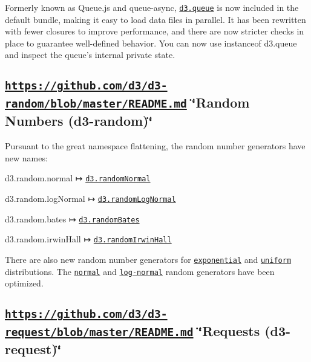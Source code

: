 Formerly known as Queue.\+js and queue-\/async, \href{https://github.com/d3/d3-queue}{\tt d3.\+queue} is now included in the default bundle, making it easy to load data files in parallel. It has been rewritten with fewer closures to improve performance, and there are now stricter checks in place to guarantee well-\/defined behavior. You can now use instanceof d3.\+queue and inspect the queue’s internal private state.

\subsection*{\href{https://github.com/d3/d3-random/blob/master/README.md}{\tt https\+://github.\+com/d3/d3-\/random/blob/master/\+R\+E\+A\+D\+M\+E.\+md} \char`\"{}\+Random Numbers (d3-\/random)\char`\"{}}

Pursuant to the great namespace flattening, the random number generators have new names\+:


\begin{DoxyItemize}
\item d3.\+random.\+normal ↦ \href{https://github.com/d3/d3-random/blob/master/README.md#randomNormal}{\tt d3.\+random\+Normal}
\item d3.\+random.\+log\+Normal ↦ \href{https://github.com/d3/d3-random/blob/master/README.md#randomLogNormal}{\tt d3.\+random\+Log\+Normal}
\item d3.\+random.\+bates ↦ \href{https://github.com/d3/d3-random/blob/master/README.md#randomBates}{\tt d3.\+random\+Bates}
\item d3.\+random.\+irwin\+Hall ↦ \href{https://github.com/d3/d3-random/blob/master/README.md#randomIrwinHall}{\tt d3.\+random\+Irwin\+Hall}
\end{DoxyItemize}

There are also new random number generators for \href{https://github.com/d3/d3-random/blob/master/README.md#randomExponential}{\tt exponential} and \href{https://github.com/d3/d3-random/blob/master/README.md#randomUniform}{\tt uniform} distributions. The \href{https://github.com/d3/d3-random/blob/master/README.md#randomNormal}{\tt normal} and \href{https://github.com/d3/d3-random/blob/master/README.md#randomLogNormal}{\tt log-\/normal} random generators have been optimized.

\subsection*{\href{https://github.com/d3/d3-request/blob/master/README.md}{\tt https\+://github.\+com/d3/d3-\/request/blob/master/\+R\+E\+A\+D\+M\+E.\+md} \char`\"{}\+Requests (d3-\/request)\char`\"{}}

